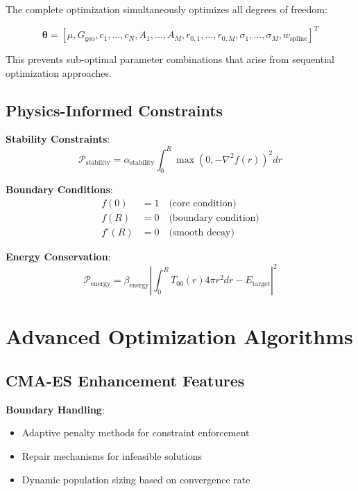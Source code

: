 \documentclass[11pt,a4paper]{article}
\begin{document}
The complete optimization simultaneously optimizes all degrees of freedom:

\begin{equation}
\boldsymbol{\theta} = [\mu, G_{\text{geo}}, c_1, \ldots, c_N, A_1, \ldots, A_M, r_{0,1}, \ldots, r_{0,M}, \sigma_1, \ldots, \sigma_M, w_{\text{spline}}]^T
\end{equation}

This prevents sub-optimal parameter combinations that arise from sequential optimization approaches.

\subsection{Physics-Informed Constraints}

\textbf{Stability Constraints}:
\begin{equation}
\mathcal{P}_{\text{stability}} = \alpha_{\text{stability}} \int_0^R \max(0, -\nabla^2 f(r))^2 dr
\end{equation}

\textbf{Boundary Conditions}:
\begin{align}
f(0) &= 1 \quad \text{(core condition)} \\
f(R) &= 0 \quad \text{(boundary condition)} \\
f'(R) &= 0 \quad \text{(smooth decay)}
\end{align}

\textbf{Energy Conservation}:
\begin{equation}
\mathcal{P}_{\text{energy}} = \beta_{\text{energy}} \left|\int_0^R T_{00}(r) 4\pi r^2 dr - E_{\text{target}}\right|^2
\end{equation}

\section{Advanced Optimization Algorithms}

\subsection{CMA-ES Enhancement Features}

\textbf{Boundary Handling}:
\begin{itemize}
\item Adaptive penalty methods for constraint enforcement
\item Repair mechanisms for infeasible solutions
\item Dynamic population sizing based on convergence rate
\end{itemize}
\end{document}
